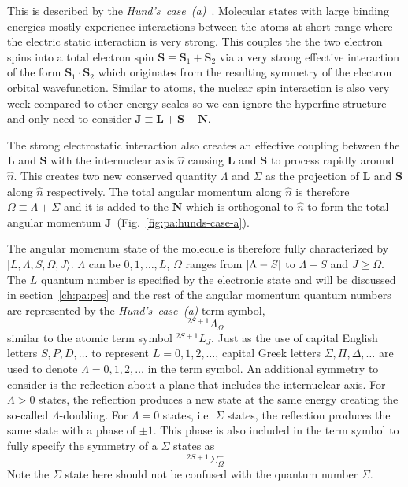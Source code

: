 This is described by the \textit{Hund's~case~(a)}~\cite[p.~523-626]{bransden_physics_2003}.
Molecular states with large binding energies mostly experience interactions
between the atoms at short range where the electric static interaction is very strong.
This couples the the two electron spins into a total electron spin
$\mathbf{S}\equiv\mathbf{S}_1+\mathbf{S}_2$ via a very strong effective interaction
of the form $\mathbf{S}_1\cdot\mathbf{S}_2$ which originates
from the resulting symmetry of the electron orbital wavefunction.
Similar to atoms, the nuclear spin interaction is also very week compared to
other energy scales so we can ignore the hyperfine structure and only need to consider
$\mathbf{J}\equiv\mathbf{L}+\mathbf{S}+\mathbf{N}$.

The strong electrostatic interaction also creates an effective coupling
between the $\mathbf{L}$ and $\mathbf{S}$ with the internuclear axis $\hat{n}$
causing $\mathbf{L}$ and $\mathbf{S}$ to process rapidly around $\hat{n}$.
This creates two new conserved quantity $\Lambda$ and $\Sigma$
as the projection of $\mathbf{L}$ and $\mathbf{S}$
along $\hat{n}$ respectively.
The total angular momentum along $\hat{n}$ is therefore $\Omega\equiv\Lambda+\Sigma$
and it is added to the $\mathbf{N}$ which is orthogonal to $\hat{n}$ to form
the total angular momentum $\mathbf{J}$~(Fig.~\ref{fig:pa:hunds-case-a}).

The angular momenum state of the molecule is therefore fully characterized by
$|L,\Lambda,S,\Omega,J\rangle$. $\Lambda$ can be $0,1,\dots,L$, $\Omega$ ranges from
${\left|{\Lambda-S}\right|}$ to $\Lambda+S$ and $J\geqslant\Omega$.
The $L$ quantum number is specified by the electronic state and will be discussed
in section~\ref{ch:pa:pes} and the rest of the angular momentum quantum numbers
are represented by the \textit{Hund's~case~(a)} term symbol,
\[ ^{2S+1}\Lambda_\Omega \]
similar to the atomic term symbol $^{2S+1}L_J$.
Just as the use of capital English letters $S,P,D,\dots$ to represent
$L=0,1,2,\dots$, capital Greek letters $\Sigma,\Pi,\Delta,\dots$ are used
to denote $\Lambda=0,1,2,\dots$ in the term symbol.
An additional symmetry to consider is the reflection about a plane that includes
the internuclear axis.
For $\Lambda>0$ states, the reflection produces a new state at the same energy
creating the so-called $\Lambda$-doubling. For $\Lambda=0$ states, i.e. $\Sigma$ states,
the reflection produces the same state with a phase of $\pm1$.
This phase is also included in the term symbol to fully specify the symmetry of
a $\Sigma$ states as
\[ ^{2S+1}\Sigma_\Omega^{\pm} \]
Note the $\Sigma$ state here should not be confused with the quantum number $\Sigma$.


